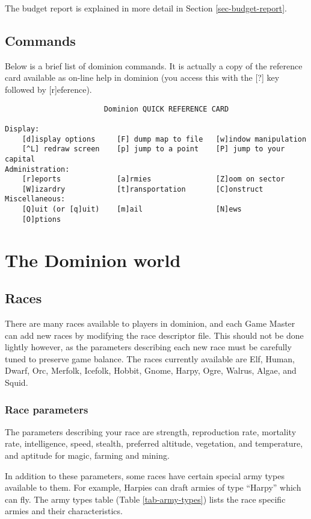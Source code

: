 The budget report is explained in more detail in Section
\ref{sec-budget-report}.

\section{Commands}
Below is a brief list of dominion commands.  It is actually a copy of
the reference card available as on-line help in dominion (you access
this with the [?] key followed by [r]eference).
\comment \newpage
\begin{verbatim}
                       Dominion QUICK REFERENCE CARD

Display:
    [d]isplay options     [F] dump map to file   [w]indow manipulation
    [^L] redraw screen    [p] jump to a point    [P] jump to your capital
Administration:
    [r]eports             [a]rmies               [Z]oom on sector
    [W]izardry            [t]ransportation       [C]onstruct
Miscellaneous:
    [Q]uit (or [q]uit)    [m]ail                 [N]ews
    [O]ptions

\end{verbatim}

\chapter{The Dominion world}

\section{Races}
\label{sec-races}
There are many races available to players in dominion, and each Game
Master can add new races by modifying the race descriptor file.
This should not be done lightly however, as the parameters describing
each new race must be carefully tuned to preserve game balance.
The races currently available are Elf, Human, Dwarf, Orc, Merfolk,
Icefolk, Hobbit, Gnome, Harpy, Ogre, Walrus, Algae, and Squid.

\subsection{Race parameters}

The parameters describing your race are strength, reproduction rate,
mortality rate, intelligence, speed, stealth, preferred altitude,
vegetation, and temperature, and aptitude for magic, farming and mining.

In addition to these parameters, some races have certain special army
types available to them.  For example, Harpies can draft armies of
type ``Harpy'' which can fly.  The army types table (Table
\ref{tab-army-types}) lists the race specific armies and their
characteristics.

